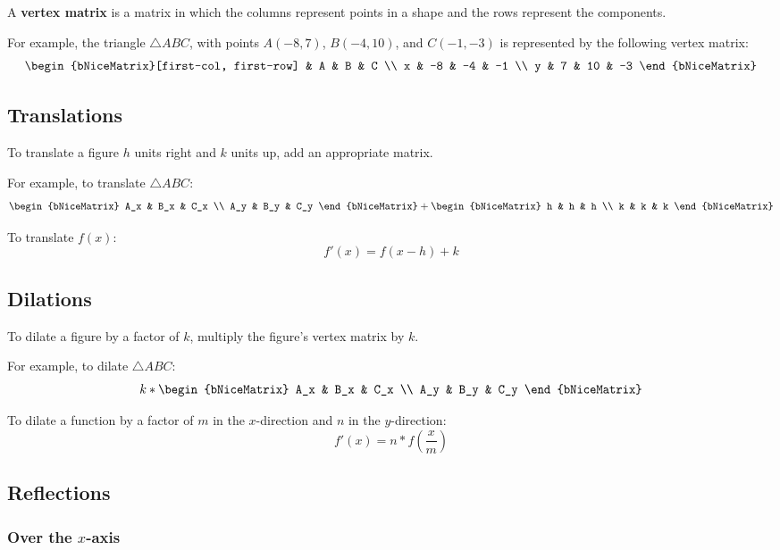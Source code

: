 A \textbf{vertex matrix} is a matrix in which the columns represent points in a shape and the rows represent the components.

For example, the triangle $\triangle ABC$, with points $A(-8, 7)$, $B(-4, 10)$, and $C(-1, -3)$ is represented by the following vertex matrix:
\[\begin{bNiceMatrix}[first-col, first-row]
	  & A  & B  & C \\
	x & -8 & -4 & -1 \\
	y & 7  & 10 & -3
\end{bNiceMatrix}\]

\subsection{Translations}

To translate a figure $h$ units right and $k$ units up, add an appropriate matrix.

For example, to translate $\triangle ABC$:
\[\begin{bNiceMatrix}
  	A_x & B_x & C_x \\
  	A_y & B_y & C_y
\end{bNiceMatrix} + \begin{bNiceMatrix}
	h & h & h \\
	k & k & k
\end{bNiceMatrix}\]

To translate $f(x)$:
\[
	f'(x) = f(x-h) + k
\]

\subsection{Dilations}

To dilate a figure by a factor of $k$, multiply the figure's vertex matrix by $k$.

For example, to dilate $\triangle ABC$:
\[
	k * 
	\begin{bNiceMatrix}
  		A_x & B_x & C_x \\
  		A_y & B_y & C_y
	\end{bNiceMatrix}
\]

To dilate a function by a factor of $m$ in the $x$-direction and $n$ in the $y$-direction:
\[
	f'(x) = n * f(\frac{x}{m})
\]

\subsection{Reflections}

\subsubsection{Over the $x$-axis}

